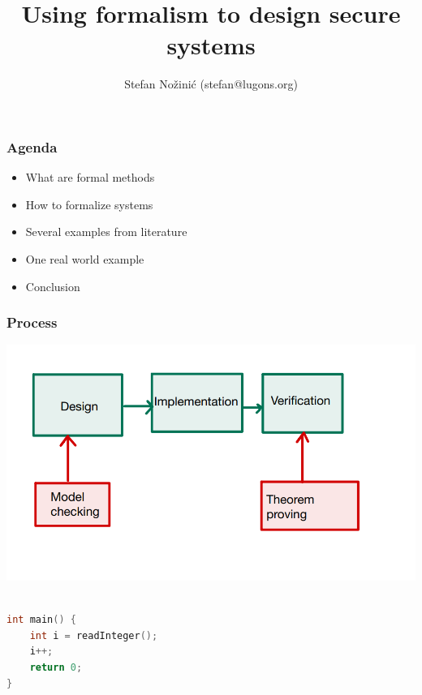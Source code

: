 \documentclass{beamer}
\begin{document}
\title{Using formalism to design secure systems}
\author{Stefan Nožinić (stefan@lugons.org)}

\frame{
\titlepage
}

\begin{frame}
    \frametitle{Agenda}
    \begin{itemize}
        \item What are formal methods
        \item How to formalize systems 
        \item Several examples from literature 
        \item One real world example
        \item Conclusion
    \end{itemize}

\end{frame}


\begin{frame}
    \frametitle{Process}
    \includegraphics[width=\textwidth]{img/2.png}

    

\end{frame}

\begin{frame}[fragile]
	\begin{lstlisting}[language=C++]

int main() {
    int i = readInteger();
    i++;
    return 0;
}

	\end{lstlisting}
	
\end{frame}
\end{document}
